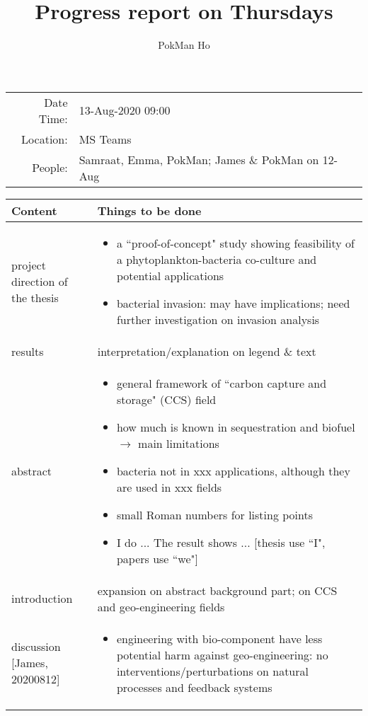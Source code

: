 \documentclass[a4paper,11pt]{article}
\title{Progress report on Thursdays}
\author{PokMan Ho}
\date{}
\begin{document}
    \maketitle
    
    \begin{tabular}{rl}
        Date Time: & 13-Aug-2020 09:00 \\
        Location: & MS Teams \\
        People: & Samraat, Emma, PokMan; James \& PokMan on 12-Aug \\
    \end{tabular}
    
    \begin{longtable}{p{.2\linewidth}p{.7\linewidth}}\hline
    Content & Things to be done\\\hline
    project direction of the thesis & \begin{itemize}
        \item a ``proof-of-concept" study showing feasibility of a phytoplankton-bacteria co-culture and potential applications
        \item bacterial invasion: may have implications; need further investigation on invasion analysis
    \end{itemize}\\
    results & interpretation/explanation on legend \& text\\
    abstract & \begin{itemize}
        \item general framework of ``carbon capture and storage" (CCS) field
        \item how much is known in sequestration and biofuel $\rightarrow$ main limitations
        \item bacteria not in xxx applications, although they are used in xxx fields
        \item small Roman numbers for listing points
        \item I do ... The result shows ... [thesis use ``I", papers use ``we"]
    \end{itemize}\\
    introduction & expansion on abstract background part; on CCS and geo-engineering fields\\
    discussion [James, 20200812] & \begin{itemize}
        \item engineering with bio-component have less potential harm against geo-engineering: no interventions/perturbations on natural processes and feedback systems

\end{itemize}
\end{longtable}
\end{document}
